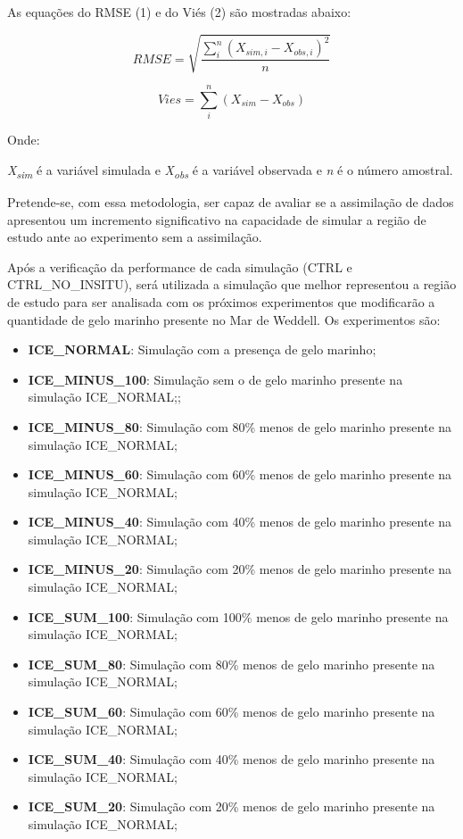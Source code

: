 \documentclass{article}
\begin{document}
As equações do RMSE (1) e do Viés (2) são mostradas abaixo:
\bigskip

\begin{equation}
	RMSE = \sqrt{\frac{\sum_{i}^{n}(X_{sim,i}-{X_{obs,i}})^2}{n}}
\end{equation}
\bigskip

\begin{equation}
	Vies = \sum_{i}^{n}(X{_{sim}-X_{obs}})
\end{equation}
\bigskip

Onde: 
\bigskip

\textit{X\textsubscript{sim}} é a variável simulada e \textit{X\textsubscript{obs}} é a variável observada e \textit{n} é o número amostral.
\bigskip

Pretende-se, com essa metodologia, ser capaz de avaliar se a assimilação de dados apresentou um incremento significativo na capacidade de simular a região de estudo ante ao 
experimento sem a assimilação. 
\bigskip

Após a verificação da performance de cada simulação (CTRL e CTRL\_NO\_INSITU), será utilizada a simulação que melhor representou a região de estudo para ser
analisada com os próximos experimentos que modificarão a quantidade de gelo marinho presente no Mar de Weddell. Os experimentos são:
\bigskip

\begin{itemize}
	\item \textbf{ICE\_NORMAL}: Simulação com a presença de gelo marinho;
	\item \textbf{ICE\_MINUS\_100}: Simulação sem o de gelo marinho presente na simulação ICE\_NORMAL;;
	\item \textbf{ICE\_MINUS\_80}: Simulação com 80\% menos de gelo marinho presente na simulação ICE\_NORMAL;
	\item \textbf{ICE\_MINUS\_60}: Simulação com 60\% menos de gelo marinho presente na simulação ICE\_NORMAL;
	\item \textbf{ICE\_MINUS\_40}: Simulação com 40\% menos de gelo marinho presente na simulação ICE\_NORMAL;
	\item \textbf{ICE\_MINUS\_20}: Simulação com 20\% menos de gelo marinho presente na simulação ICE\_NORMAL;
	\item \textbf{ICE\_SUM\_100}: Simulação com 100\% menos de gelo marinho presente na simulação ICE\_NORMAL;
	\item \textbf{ICE\_SUM\_80}: Simulação com 80\% menos de gelo marinho presente na simulação ICE\_NORMAL;
	\item \textbf{ICE\_SUM\_60}: Simulação com 60\% menos de gelo marinho presente na simulação ICE\_NORMAL;
	\item \textbf{ICE\_SUM\_40}: Simulação com 40\% menos de gelo marinho presente na simulação ICE\_NORMAL;
	\item \textbf{ICE\_SUM\_20}: Simulação com 20\% menos de gelo marinho presente na simulação ICE\_NORMAL;
\end{itemize}
\bigskip
\end{document}
